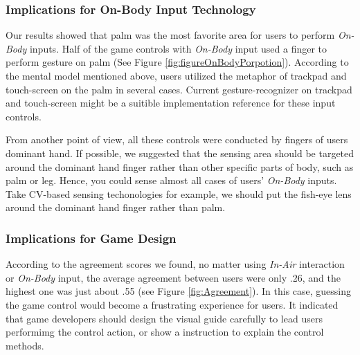 \documentclass{sigchi}
\begin{document}
  \subsubsection{Implications for On-Body Input Technology}
    Our results showed that palm was the most favorite area for users to perform \emph{On-Body} inputs. Half of the game controls with \emph{On-Body} input used a finger to perform gesture on palm (See Figure \ref{fig:figureOnBodyPorpotion}). According to the mental model mentioned above, users utilized the metaphor of trackpad and touch-screen on the palm in several cases. Current gesture-recognizer on trackpad and touch-screen might be a suitible implementation reference for these input controls.

    From another point of view, all these controls were conducted by fingers of users dominant hand. If possible, we suggested that the sensing area should be targeted around the dominant hand finger rather than other specific parts of body, such as palm or leg. Hence, you could sense almost all cases of users' \emph{On-Body} inputs. Take CV-based sensing techonologies for example, we should put the fish-eye lens around the dominant hand finger rather than palm.

  \subsubsection{Implications for Game Design}
  According to the agreement scores we found, no matter using \emph{In-Air} interaction or \emph{On-Body} input, the average agreement between users were only .26, and the highest one was just about .55 (see Figure \ref{fig:Agreement}). In this case, guessing the game control would become a frustrating experience for users. It indicated that game developers should design the visual guide carefully to lead users performimg the control action, or show a instruction to explain the control methods.
\end{document}
